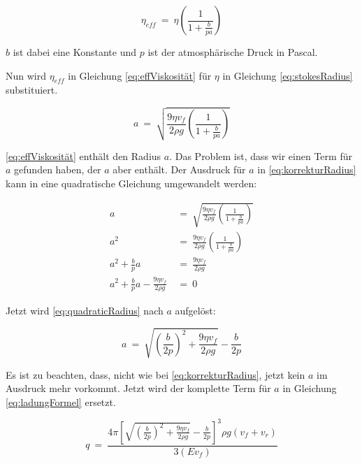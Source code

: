 \begin{equation}\label{eq:effViskosität}
	\eta_{eff} \ = \ \eta \left( \frac{1}{1 + \frac{b}{pa}} \right) 
\end{equation}

\noindent $b$ ist dabei eine Konstante und $p$ ist der atmosphärische Druck in Pascal. 

\noindent Nun wird $\eta_{eff}$ in Gleichung \ref{eq:effViskosität} für $\eta$ in Gleichung \ref{eq:stokesRadius} substituiert. 

\begin{equation}\label{eq:korrekturRadius}
	a \ = \ \sqrt{\frac{9\eta v_f}{2\rho g} \left( \frac{1}{1 + \frac{b}{pa}}\right)}
\end{equation}

\noindent \autoref{eq:effViskosität} enthält den Radius $a$. Das Problem ist, dass wir einen Term für $a$ gefunden haben, der $a$ aber enthält. Der Ausdruck für $a$ in \autoref{eq:korrekturRadius} kann in eine quadratische Gleichung umgewandelt werden:

\begin{equation}\label{eq:quadraticRadius}
	\begin{split}
		a & \ = \ \sqrt{\frac{9\eta v_f}{2\rho g} \left( \frac{1}{1 + \frac{b}{pa}}\right)} \\
		a^2 & \ = \ \frac{9\eta v_f}{2\rho g} \left( \frac{1}{1 + \frac{b}{pa}}\right) \\
		a^2 + \frac{b}{p}a & \ = \ \frac{9\eta v_f}{2\rho g} \\
		a^2 + \frac{b}{p}a - \frac{9\eta v_f}{2\rho g} & \ = \ 0
	\end{split}
\end{equation} 

\noindent Jetzt wird \autoref{eq:quadraticRadius} nach $a$ aufgelöst:

\begin{equation}\label{eq:qRadius}
	a \ = \ \sqrt{\left( \frac{b}{2p}\right)^2 + \frac{9\eta v_f}{2\rho g}} - \frac{b}{2p}
\end{equation}

\noindent Es ist zu beachten, dass, nicht wie bei \autoref{eq:korrekturRadius}, jetzt kein $a$ im Ausdruck mehr vorkommt. Jetzt wird der komplette Term für $a$ in Gleichung \ref{eq:ladungFormel} ersetzt.

\begin{equation}\label{eq:ladungMitEingesetzR}
	q \ = \ \frac{4\pi \left[ \sqrt{\left( \frac{b}{2p}\right)^2 + \frac{9\eta v_f}{2\rho g}} - \frac{b}{2p} \right]^3 \rho g(v_f + v_r) }{3(Ev_f)}
\end{equation}

